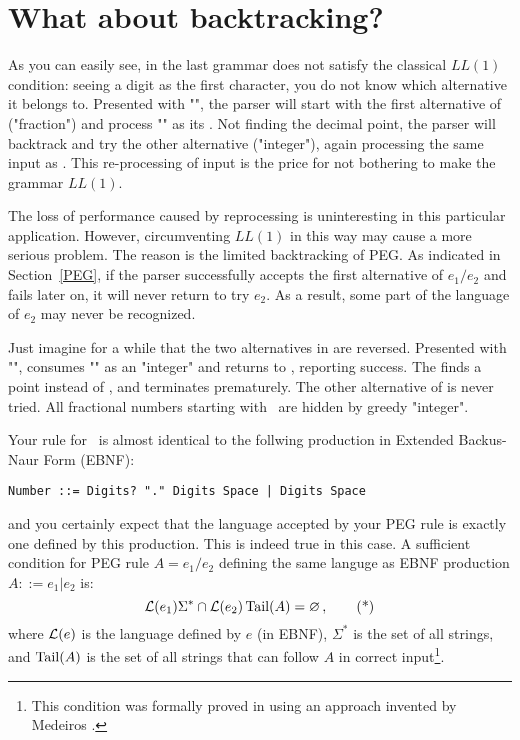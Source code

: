 
\section{What about backtracking?\label{back}}


As you can easily see,  in the last grammar
does not satisfy the classical $LL(1)$ condition:
seeing a digit as the first character,
you do not know which alternative it belongs to.
Presented with "", the parser will start with
the first alternative of  ("fraction")
and process "" as its \Digits. 
Not finding the decimal point, the parser will backtrack and try
the other alternative ("integer"),
again processing the same input as \Digits.
This re-processing of input is the price for not bothering
to make the grammar $LL(1)$.

The loss of performance caused by reprocessing is uninteresting
in this particular application.
However, circumventing $LL(1)$ in this way may cause a more serious problem.
The reason is the limited backtracking of PEG.
As indicated in Section~\ref{PEG}, 
if the parser successfully accepts the first alternative 
of $e_1 / e_2$ and fails later on, 
it will never return to try $e_2$.
As a result, some part of the language of $e_2$ may never be recognized.

Just imagine for a while that the two alternatives in 
are reversed. 
Presented with "",  consumes "" as an "integer"
and returns to , reporting success.
The  finds a point instead of , 
and terminates prematurely. 
The other alternative of  is never tried.
All fractional numbers starting with \Digits\ are hidden by greedy "integer".

Your rule for \Number\ is almost identical to the follwing production
in Extended Backus-Naur Form (EBNF):

\small
\begin{Verbatim}[samepage=true,xleftmargin=15mm,baselinestretch=0.8]
 Number ::= Digits? "." Digits Space | Digits Space
\end{Verbatim}
\normalsize

and you certainly expect that the language accepted by your PEG rule
is exactly one defined by this production.
This is indeed true in this case.
A sufficient condition 
for PEG rule $A = e_1 / e_2$ defining the same languge
as EBNF production $A ::= e_1 | e_2$ is:
%
\begin{equation}\label{star}
\mathcal{L}(e_1)\Sigma^* \cap \mathcal{L}(e_2)\operatorname{Tail}(A) = \varnothing\,, \tag{*}
\end{equation}
%
where $\mathcal{L}(e)$ is the language defined by $e$ (in EBNF),
$\Sigma^*$ is the set of all strings,
and $\operatorname{Tail}(A)$ is the set of all strings that can follow $A$ in correct input\footnote{
This condition was formally proved in \cite{Redz:2014:FI}
using an approach invented by Medeiros \cite{Medeiros:2014}.}.

